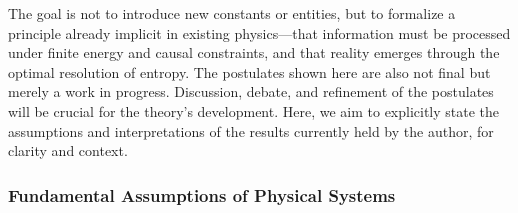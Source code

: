 \documentclass[12pt]{article}
\begin{document}
The goal is not to introduce new constants or entities, but to formalize a principle already implicit in existing physics—that information must be processed under finite energy and causal constraints, and that reality emerges through the optimal resolution of entropy. The postulates shown here are also not final but merely a work in progress. Discussion, debate, and refinement of the postulates will be crucial for the theory's development. Here, we aim to explicitly state the assumptions and interpretations of the results currently held by the author, for clarity and context.

\subsubsection{Fundamental Assumptions of Physical Systems}
\end{document}
